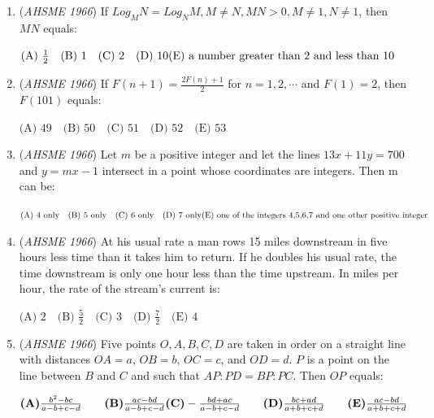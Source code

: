 \begin{enumerate}
 $\text{(A) } x\le-2 \text{ or } x\ge3 \quad \text{(B) }  x\le2 \text{ or } x\ge3 \quad \text{(C) }  x\le-3 \text{ or } x\ge2 \quad \\ \text{(D) } -3\le x\le2 \quad \text{(E) } -2\le x\le3$


	\item (\textit{AHSME 1966}) If $Log_M{N}=Log_N{M},M \ne N,MN>0,M \ne 1, N \ne 1$, then $MN$ equals:


 $\text{(A) } \frac{1}{2} \quad \text{(B) } 1 \quad \text{(C) } 2 \quad \text{(D) } 10 \\ \text{(E) a number greater than 2 and less than 10}$


	\item (\textit{AHSME 1966}) If $F(n+1)=\frac{2F(n)+1}{2}$ for $n=1,2,\cdots$ and $F(1)=2$, then $F(101)$ equals:


 $\text{(A) } 49 \quad \text{(B) } 50 \quad \text{(C) } 51 \quad \text{(D) } 52 \quad \text{(E) } 53$


	\item (\textit{AHSME 1966}) Let $m$ be a positive integer and let the lines $13x+11y=700$ and $y=mx-1$ intersect in a point whose coordinates are integers. Then m can be:


 $\text{(A) 4 only} \quad \text{(B) 5 only} \quad \text{(C) 6 only} \quad \text{(D) 7 only} \\ \text{(E) one of the integers 4,5,6,7 and one other positive integer}$


	\item (\textit{AHSME 1966}) At his usual rate a man rows 15 miles downstream in five hours less time than it takes him to return. If he doubles his usual rate, the time downstream is only one hour less than the time upstream. In miles per hour, the rate of the stream's current is:


 $\text{(A) } 2 \quad \text{(B) } \frac{5}{2} \quad \text{(C) } 3 \quad \text{(D) } \frac{7}{2} \quad \text{(E) } 4$


	\item (\textit{AHSME 1966}) Five points $O,A,B,C,D$ are taken in order on a straight line with distances $OA = a$, $OB = b$, $OC = c$, and $OD = d$.  $P$ is a point on the line between $B$ and $C$ and such that $AP: PD = BP: PC$.  Then $OP$ equals:


 $\textbf{(A)} \frac {b^2 - bc}{a - b + c - d} \qquad \textbf{(B)} \frac {ac - bd}{a - b + c - d} \\  \textbf{(C)} - \frac {bd + ac}{a - b + c - d} \qquad \textbf{(D)} \frac {bc + ad}{a + b + c + d} \qquad \textbf{(E)} \frac {ac - bd}{a + b + c + d}$



\end{enumerate}
